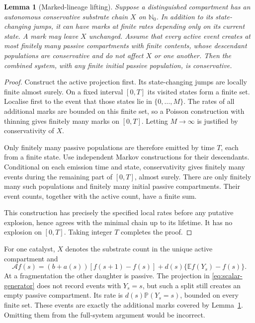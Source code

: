 \documentclass[11pt,a4paper]{article}
\newtheorem{lemma}[theorem]{Lemma}
\theoremstyle{remark}\newtheorem{remark}[theorem]{Remark}
\newcommand{\Nzero}{\mathbb N_0}
\newcommand{\E}{\mathbb E}
\newcommand{\Prob}{\mathbb P}
\newcommand{\A}{\mathcal A}
\begin{document}
\begin{lemma}[Marked-lineage lifting]\label{lem:lift}
Suppose a distinguished compartment has an autonomous conservative substrate chain $X$ on $\Nzero$. In addition to its state-changing jumps, it can have marks at finite rates depending only on its current state. A mark may leave $X$ unchanged. Assume that every active event creates at most finitely many passive compartments with finite contents, whose descendant populations are conservative and do not affect $X$ or one another. Then the combined system, with any finite initial passive population, is conservative.
\end{lemma}
\begin{proof}
Construct the active projection first. Its state-changing jumps are locally finite almost surely. On a fixed interval $[0,T]$ its visited states form a finite set. Localise first to the event that those states lie in $\{0,\ldots,M\}$. The rates of all additional marks are bounded on this finite set, so a Poisson construction with thinning gives finitely many marks on $[0,T]$. Letting $M\to\infty$ is justified by conservativity of $X$.

Only finitely many passive populations are therefore emitted by time $T$, each from a finite state. Use independent Markov constructions for their descendants. Conditional on each emission time and state, conservativity gives finitely many events during the remaining part of $[0,T]$, almost surely. There are only finitely many such populations and finitely many initial passive compartments. Their event counts, together with the active count, have a finite sum.

This construction has precisely the specified local rates before any putative explosion, hence agrees with the minimal chain up to its lifetime. It has no explosion on $[0,T]$. Taking integer $T$ completes the proof.
\end{proof}

For one catalyst, $X$ denotes the substrate count in the unique active compartment and
\begin{equation}\label{eq:scalar-generator}
\A f(s)=(b+a(s))[f(s+1)-f(s)]
       +d(s)\{\E f(Y_s)-f(s)\}.
\end{equation}
At a fragmentation the other daughter is passive. The projection in \eqref{eq:scalar-generator} does not record events with $Y_s=s$, but such a split still creates an empty passive compartment. Its rate is $d(s)\Prob(Y_s=s)$, bounded on every finite set. These events are exactly the additional marks covered by Lemma~\ref{lem:lift}. Omitting them from the full-system argument would be incorrect.
\end{document}

